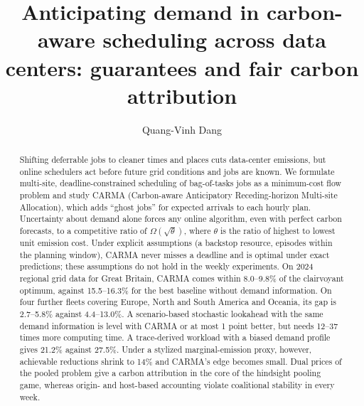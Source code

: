 \documentclass[preprint,12pt]{elsarticle}
\begin{document}
\begin{frontmatter}

\title{Anticipating demand in carbon-aware scheduling across data centers: guarantees and fair carbon attribution}

\author{Quang-Vinh Dang}

\begin{abstract}
Shifting deferrable jobs to cleaner times and places cuts data-center emissions, but online schedulers act before future grid conditions and jobs are known. We formulate multi-site, deadline-constrained scheduling of bag-of-tasks jobs as a minimum-cost flow problem and study CARMA (Carbon-aware Anticipatory Receding-horizon Multi-site Allocation), which adds ``ghost jobs'' for expected arrivals to each hourly plan. Uncertainty about demand alone forces any online algorithm, even with perfect carbon forecasts, to a competitive ratio of $\Omega(\sqrt{\theta})$, where $\theta$ is the ratio of highest to lowest unit emission cost. Under explicit assumptions (a backstop resource, episodes within the planning window), CARMA never misses a deadline and is optimal under exact predictions; these assumptions do not hold in the weekly experiments. On 2024 regional grid data for Great Britain, CARMA comes within 8.0--9.8\% of the clairvoyant optimum, against 15.5--16.3\% for the best baseline without demand information. On four further fleets covering Europe, North and South America and Oceania, its gap is 2.7--5.8\% against 4.4--13.0\%. A scenario-based stochastic lookahead with the same demand information is level with CARMA or at most 1 point better, but needs 12--37 times more computing time. A trace-derived workload with a biased demand profile gives 21.2\% against 27.5\%. Under a stylized marginal-emission proxy, however, achievable reductions shrink to 14\% and CARMA's edge becomes small. Dual prices of the pooled problem give a carbon attribution in the core of the hindsight pooling game, whereas origin- and host-based accounting violate coalitional stability in every week.
\end{abstract}


\end{frontmatter}
\end{document}
